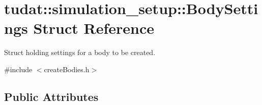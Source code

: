 \hypertarget{structtudat_1_1simulation__setup_1_1BodySettings}{}\section{tudat\+:\+:simulation\+\_\+setup\+:\+:Body\+Settings Struct Reference}
\label{structtudat_1_1simulation__setup_1_1BodySettings}


Struct holding settings for a body to be created.  




{\ttfamily \#include $<$create\+Bodies.\+h$>$}

\subsection*{Public Attributes}
